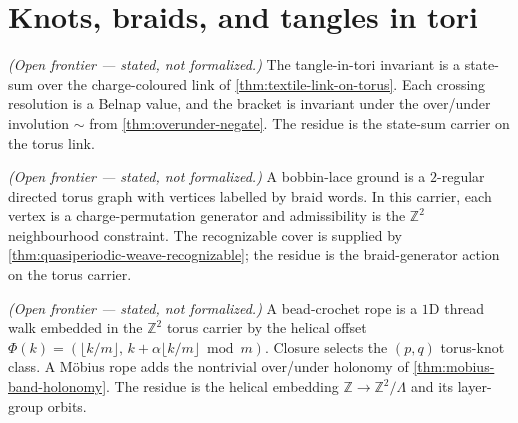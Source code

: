 \section{Knots, braids, and tangles in tori}

\begin{theorem}\label{thm:torus-tangle-charge-invariant}\notready{}
\emph{(Open frontier --- stated, not formalized.)} The tangle-in-tori invariant is
a state-sum over the charge-coloured link of \cref{thm:textile-link-on-torus}.  Each
crossing resolution is a Belnap value, and the bracket is invariant under the
over/under involution $\sim$ from \cref{thm:overunder-negate}.  The residue is the
state-sum carrier on the torus link.
\end{theorem}

\begin{theorem}\label{thm:bobbin-lace-braid-word}\notready{}
\emph{(Open frontier --- stated, not formalized.)} A bobbin-lace ground is a
$2$-regular directed torus graph with vertices labelled by braid words.  In this
carrier, each vertex is a charge-permutation generator and admissibility is the
$\mathbb{Z}^2$ neighbourhood constraint.  The recognizable cover is supplied by
\cref{thm:quasiperiodic-weave-recognizable}; the residue is the braid-generator
action on the torus carrier.
\end{theorem}

\begin{theorem}\label{thm:beadcrochet-rope-torus-knot}\notready{}
\emph{(Open frontier --- stated, not formalized.)} A bead-crochet rope is a $1$D
thread walk embedded in the $\mathbb{Z}^2$ torus carrier by the helical offset
$\Phi(k)=(\lfloor k/m\rfloor,\,k+\alpha\lfloor k/m\rfloor\bmod m)$.  Closure
selects the $(p,q)$ torus-knot class.  A M\"obius rope adds the nontrivial
over/under holonomy of \cref{thm:mobius-band-holonomy}.  The residue is the
helical embedding $\mathbb{Z}\to\mathbb{Z}^2/\Lambda$ and its layer-group orbits.
\end{theorem}
